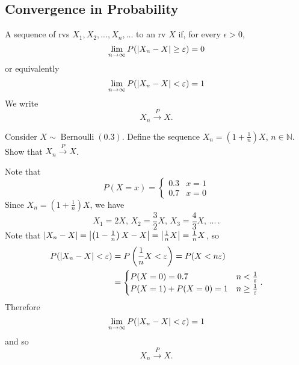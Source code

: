\documentclass[notoc,notitlepage]{tufte-book}
\DeclareMathOperator{\Bernoulli}{Bernoulli }
\newcommand{\convp}{\overset{P}{\to}}
\begin{document}
\subsection{Convergence in Probability}%
\label{sub:convergence_in_probability}

\begin{defn}
\label{defn:convergence_in_probability}
  A sequence of rvs $X_1, X_2,..., X_n, ...$  to an rv $X$ if, for every $\epsilon > 0$,
  \begin{equation*}
    \lim_{n \to \infty} P ( \left|X_n - X\right| \geq \varepsilon ) = 0
  \end{equation*}
  or equivalently
  \begin{equation*}
    \lim_{n \to \infty} P(\left|X_n - X\right| < \varepsilon) = 1
  \end{equation*}
  We write
  \begin{equation*}
    X_n \convp X.
  \end{equation*}
\end{defn}

\begin{eg}[Example 5.3]
  Consider $X \sim \Bernoulli(0.3)$. Define the sequence $X_n = \left(1 + \frac{1}{n}\right) X$, $n \in \mathbb{N}$. Show that $X_n \convp X$.
\end{eg}

\begin{solution}
  Note that
  \begin{equation*}
    P(X = x) = \begin{cases}
      0.3 & x = 1 \\
      0.7 & x = 0
    \end{cases}
  \end{equation*}
  Since $X_n = \left(1 + \frac{1}{n}\right) X$, we have
  \begin{equation*}
    X_1 = 2X, \, X_2 = \frac{3}{2} X, \, X_3 = \frac{4}{3} X, \, ... \,.
  \end{equation*}
  Note that $\left|X_n - X\right| = \left|\left(1 - \frac{1}{n}\right) X - X\right| = \left|\frac{1}{n}X\right| = \frac{1}{n} X$, so
  \begin{align*}
    P(\left|X_n - X\right| < \varepsilon) &= P \left( \frac{1}{n} X < \varepsilon \right) = P( X < n \varepsilon ) \\
                                &= \begin{cases}
    P( X = 0 ) = 0.7 & n < \frac{1}{\varepsilon} \\
    P( X = 1 ) + P( X = 0 ) = 1 & n \geq \frac{1}{\varepsilon}
                                \end{cases}.
  \end{align*}
  Therefore
  \begin{equation*}
    \lim_{n \to \infty} P( \left|X_n - X\right| < \varepsilon ) = 1
  \end{equation*}
  and so
  \begin{equation*}
    X_n \convp X.
  \end{equation*}
\end{solution}
\end{document}
